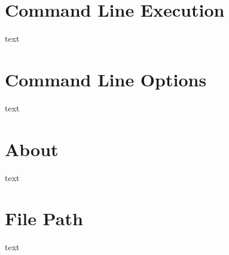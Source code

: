 \section*{Command Line Execution}

text

\section*{Command Line Options}

text

\section*{About}

text

\section*{File Path}

text 
